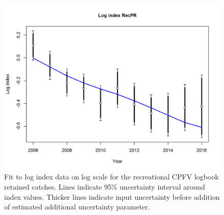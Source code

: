 \documentclass[12pt,]{article}
\begin{document}
\begin{figure}[htbp]
\centering
\includegraphics{r4ss/plots_mod1/index5_logcpuefit_RecPR.png}
\caption{Fit to log index data on log scale for the recreational CPFV
logbook retained catches. Lines indicate 95\% uncertainty interval
around index values. Thicker lines indicate input uncertainty before
addition of estimated additional uncertainty parameter.
\label{fig:index5_logcpuefit_RecPR}}
\end{figure}

\FloatBarrier
\end{document}

